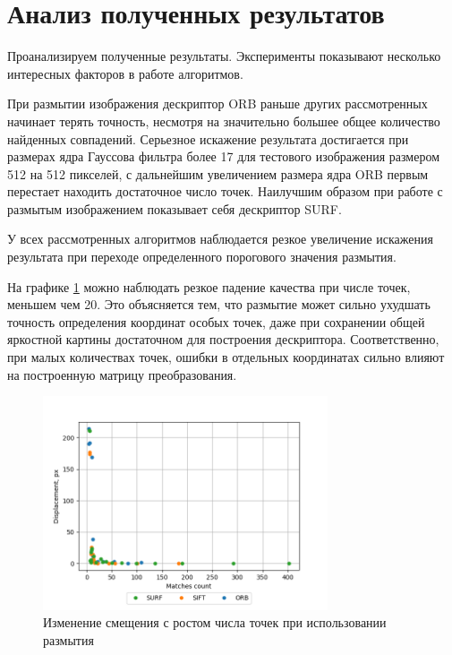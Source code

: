 \section{Анализ полученных результатов}
{
    Проанализируем полученные результаты. Эксперименты показывают несколько интересных факторов в работе алгоритмов. 
    
    При размытии изображения дескриптор ORB раньше других рассмотренных начинает терять точность, несмотря на значительно большее общее количество найденных совпадений. Серьезное искажение результата достигается при размерах ядра Гауссова фильтра более 17 для тестового изображения размером 512 на 512 пикселей, с дальнейшим увеличением размера ядра ORB первым перестает находить достаточное число точек. Наилучшим образом при работе с размытым изображением показывает себя дескриптор SURF.
    
    У всех рассмотренных алгоритмов наблюдается резкое увеличение искажения результата при переходе определенного порогового значения размытия.
    
    На графике \ref{blur d by m} можно наблюдать резкое падение качества при числе точек, меньшем чем 20. Это объясняется тем, что размытие может сильно ухудшать точность определения координат особых точек, даже при сохранении общей яркостной картины достаточном для построения дескриптора. Соответственно, при малых количествах точек, ошибки в отдельных координатах сильно влияют на построенную матрицу преобразования.
    
    \begin{figure}[H]
    	\centering                             
    	\includegraphics[width=0.75\textwidth,keepaspectratio]{ex1/Rand_noises_d_by_m.png}      
    	\centering\caption{  Изменение смещения с ростом числа точек при использовании размытия}
    	\label{blur d by m}    
	\end{figure} 
	
}
